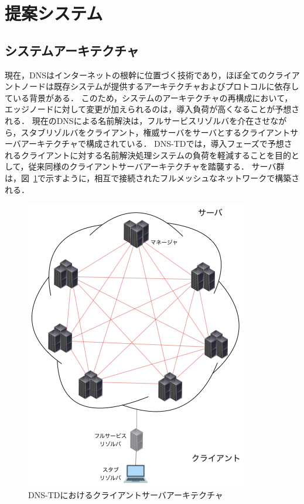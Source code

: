 \section{提案システム}
\label{sec:proposed-system}
\subsection{システムアーキテクチャ}
\label{sec:system-architecture}
現在，DNSはインターネットの根幹に位置づく技術であり，ほぼ全てのクライアントノードは既存システムが提供するアーキテクチャおよびプロトコルに依存している背景がある．
このため，システムのアーキテクチャの再構成において，エッジノードに対して変更が加えられるのは，導入負荷が高くなることが予想される．
現在のDNSによる名前解決は，フルサービスリゾルバを介在させながら，スタブリゾルバをクライアント，権威サーバをサーバとするクライアントサーバアーキテクチャで構成されている．
DNS-TDでは，導入フェーズで予想されるクライアントに対する名前解決処理システムの負荷を軽減することを目的として，従来同様のクライアントサーバアーキテクチャを踏襲する．
サーバ群は，図~\ref{fig:system-architecture}で示すように，相互で接続されたフルメッシュなネットワークで構築される．
\begin{figure}[htbp]
 \centering
 \includegraphics[scale=0.3]{figure/system-architecture.png}
 \caption{DNS-TDにおけるクライアントサーバアーキテクチャ}
 \label{fig:system-architecture}
\end{figure}
